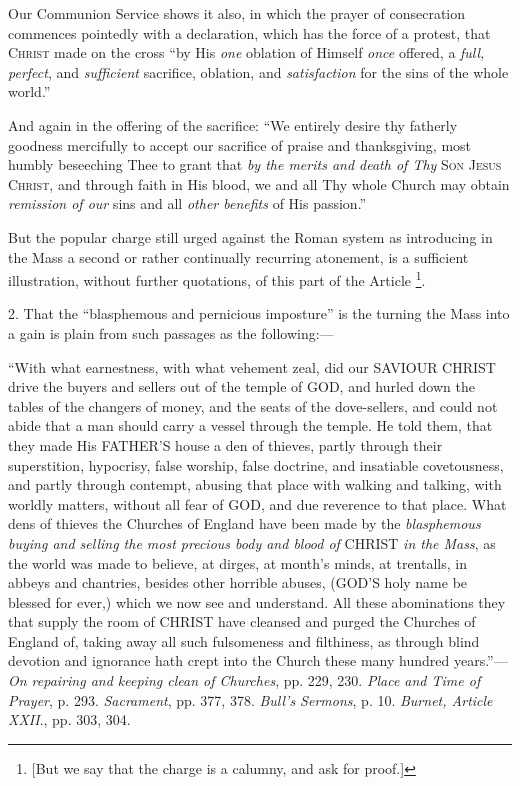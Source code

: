 Our Communion Service shows it also, in which the prayer of
consecration commences pointedly with a declaration, which has the
force of a protest, that C\textsc{hrist} made on the
cross ``by His \emph{one} oblation of Himself \emph{once} offered,
a \emph{full, perfect}, and \emph{sufficient} sacrifice, oblation, and
\emph{satisfaction} for the sins of the whole world.''

And again in the offering of the sacrifice: ``We entirely
desire thy fatherly goodness mercifully to accept our sacrifice of
praise and thanksgiving, most humbly beseeching Thee to grant that \emph{by
the merits and death of Thy} S\textsc{on} J\textsc{esus}
C\textsc{hrist}, and through faith in His blood, we and
all Thy whole Church may obtain \emph{remission of our} sins and
all \emph{other benefits} of His passion.''

But the popular charge still urged against the Roman system as
introducing in the Mass a second or rather continually recurring
atonement, is a sufficient illustration, without further quotations,
of this part of the Article \footnote{[But we say that the charge is a calumny,
and ask for proof.]}.

2. That the ``blasphemous and pernicious imposture'' is the
turning the Mass into a gain is plain from such passages as the
following:—

``With what earnestness, with what vehement
zeal, did our SAVIOUR CHRIST
drive the buyers and sellers out of the temple of GOD,
and hurled down the tables of the changers of money, and the seats of
the dove-sellers, and could not abide that a man should carry a vessel
through the temple. He told them, that they made His FATHER'S
house a den of thieves, partly through their superstition, hypocrisy,
false worship, false doctrine, and insatiable covetousness, and partly
through contempt, abusing that place with walking and talking, with
worldly matters, without all fear of GOD,
and due reverence to that place. What dens of thieves the Churches of
England have been made by the \emph{blasphemous buying and selling the
most precious body and blood of} CHRIST
\emph{in the Mass}, as the world was made to believe, at dirges, at
month's minds, at trentalls, in abbeys and chantries, besides other
horrible abuses, (GOD'S
holy name be blessed for ever,) which we now see and understand. All
these abominations they that supply the room of CHRIST
have cleansed and purged the Churches of England of, taking away all
such fulsomeness and filthiness, as through blind devotion and
ignorance hath crept into the Church these many hundred years.''—\emph{On
repairing and keeping clean of Churches}, pp. 229, 230. \emph{Place
and Time of Prayer}, p. 293. \emph{Sacrament}, pp. 377, 378. \emph{Bull's
Sermons}, p. 10. \emph{Burnet, Article XXII}., pp. 303, 304.

